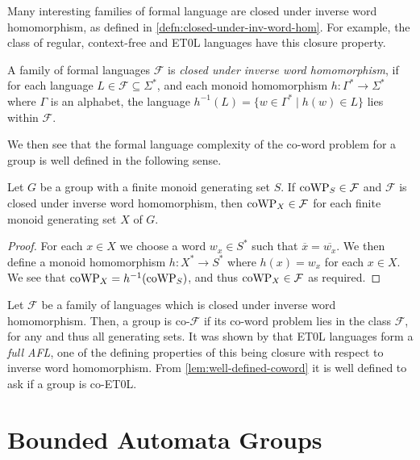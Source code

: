Many interesting families of formal language are closed under inverse word homomorphism, as defined in \cref{defn:closed-under-inv-word-hom}.
For example, the class of regular, context-free and ET0L languages have this closure property.

\begin{definition}\label{defn:closed-under-inv-word-hom}
	A family of formal languages $\mathcal{F}$ is \emph{closed under inverse word homomorphism}, if for each language $L \in \mathcal{F} \subseteq \Sigma^*$, and each monoid homomorphism $h \colon \Gamma^* \to \Sigma^*$ where $\Gamma$ is an alphabet, the language
	$
		h^{-1}(L)
		=
		\{
			w \in \Gamma^*
			\mid
			h(w) \in L
		\}
	$
	lies within $\mathcal{F}$.
\end{definition}

We then see that the formal language complexity of the co-word problem for a group is well defined in the following sense.

\begin{lemma}\label{lem:well-defined-coword}
	Let $G$ be a group with a finite monoid generating set $S$.
	If $\mathrm{coWP}_S \in \mathcal{F}$ and $\mathcal{F}$ is closed under inverse word homomorphism, then $\mathrm{coWP}_X \in \mathcal{F}$ for each finite monoid generating set $X$ of $G$.
\end{lemma}

\begin{proof}
	For each $x \in X$ we choose a word $w_x \in S^*$ such that $\overline{x} = \overline{w_x}$.
	We then define a monoid homomorphism $h \colon X^* \to S^*$ where $h(x) = w_x$ for each $x \in X$.
	We see that $\mathrm{coWP}_X = h^{-1}(\mathrm{coWP}_S)$, and thus $\mathrm{coWP}_X \in \mathcal{F}$ as required.
\end{proof}

Let $\mathcal{F}$ be a family of languages which is closed under inverse word homomorphism.
Then, a group is co-$\mathcal{F}$ if its co-word problem lies in the class $\mathcal{F}$, for any and thus all generating sets.
It was shown by \textcite[Corollary~3.2~on~p.~40]{culik1974} that ET0L languages form a \emph{full AFL}, one of the defining properties of this being closure with respect to inverse word homomorphism.
From \cref{lem:well-defined-coword} it is well defined to ask if a group is co-ET0L.

\section{Bounded Automata Groups}\label{sec:bounded-automata-groups}

